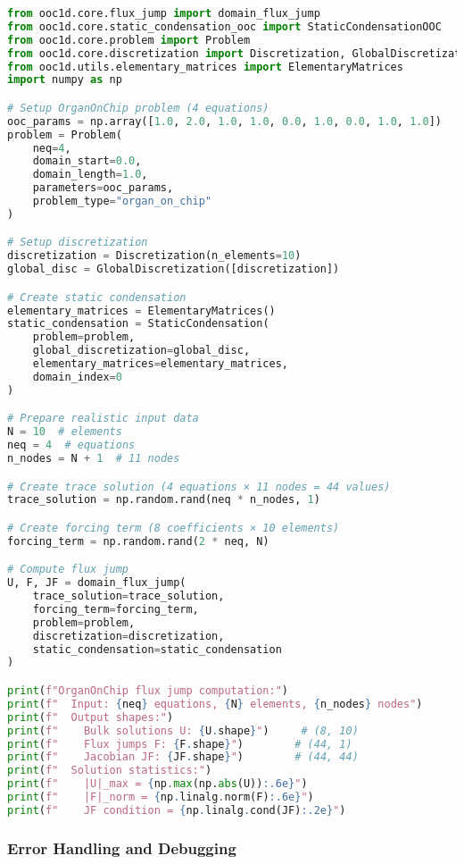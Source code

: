 \begin{lstlisting}[language=Python, caption=Real Static Condensation Integration]
from ooc1d.core.flux_jump import domain_flux_jump
from ooc1d.core.static_condensation_ooc import StaticCondensationOOC
from ooc1d.core.problem import Problem
from ooc1d.core.discretization import Discretization, GlobalDiscretization
from ooc1d.utils.elementary_matrices import ElementaryMatrices
import numpy as np

# Setup OrganOnChip problem (4 equations)
ooc_params = np.array([1.0, 2.0, 1.0, 1.0, 0.0, 1.0, 0.0, 1.0, 1.0])
problem = Problem(
    neq=4,
    domain_start=0.0,
    domain_length=1.0,
    parameters=ooc_params,
    problem_type="organ_on_chip"
)

# Setup discretization
discretization = Discretization(n_elements=10)
global_disc = GlobalDiscretization([discretization])

# Create static condensation
elementary_matrices = ElementaryMatrices()
static_condensation = StaticCondensation(
    problem=problem,
    global_discretization=global_disc,
    elementary_matrices=elementary_matrices,
    domain_index=0
)

# Prepare realistic input data
N = 10  # elements
neq = 4  # equations
n_nodes = N + 1  # 11 nodes

# Create trace solution (4 equations × 11 nodes = 44 values)
trace_solution = np.random.rand(neq * n_nodes, 1)

# Create forcing term (8 coefficients × 10 elements)
forcing_term = np.random.rand(2 * neq, N)

# Compute flux jump
U, F, JF = domain_flux_jump(
    trace_solution=trace_solution,
    forcing_term=forcing_term,
    problem=problem,
    discretization=discretization,
    static_condensation=static_condensation
)

print(f"OrganOnChip flux jump computation:")
print(f"  Input: {neq} equations, {N} elements, {n_nodes} nodes")
print(f"  Output shapes:")
print(f"    Bulk solutions U: {U.shape}")     # (8, 10)
print(f"    Flux jumps F: {F.shape}")        # (44, 1)
print(f"    Jacobian JF: {JF.shape}")        # (44, 44)
print(f"  Solution statistics:")
print(f"    |U|_max = {np.max(np.abs(U)):.6e}")
print(f"    |F|_norm = {np.linalg.norm(F):.6e}")
print(f"    JF condition = {np.linalg.cond(JF):.2e}")
\end{lstlisting}



\subsubsection{Error Handling and Debugging}

